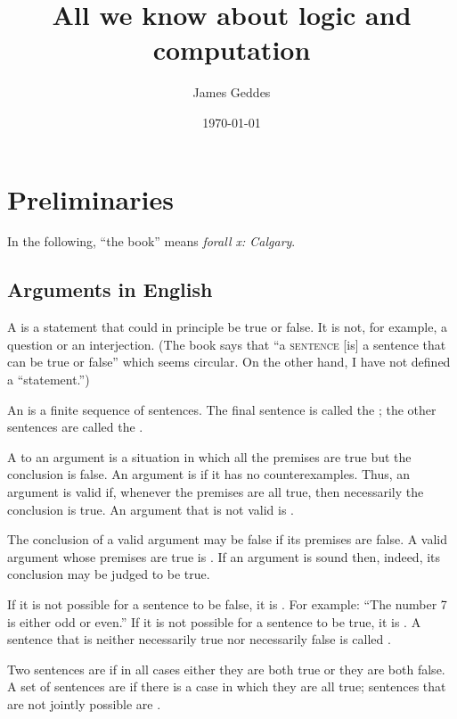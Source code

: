 \documentclass{article}
\title{All we know about logic and computation}
\author{James Geddes}
\date{\today}
\begin{document}
\maketitle
\section{Preliminaries}

In the following, ``the book'' means \emph{forall x: Calgary}.

\subsection{Arguments in English}
\label{sec:english}
A  is a statement that could in principle be true or
false.  It is not, for example, a question or an interjection.  (The
book says that ``a \textsc{sentence} [is] a sentence that can be true or
false'' which seems circular.  On the other hand, I have not defined a
``statement.'')

An  is a finite sequence of sentences.  The final sentence is called the ; the other sentences are called the . 

A  to an argument is a situation in which all the
premises are true but the conclusion is false.  An argument is
 if it has no counterexamples.  Thus, an
argument is valid if, whenever the premises are all true, then
necessarily the conclusion is true.  An argument that is not valid is
.

The conclusion of a valid argument may be false if its premises are false.  A valid argument whose premises are true is . If an argument is sound then, indeed, its conclusion may be judged to be true. 

If it is not possible for a sentence to be false, it is .  For example: ``The number 7 is
either odd or even.''  If it is not possible for a sentence to be true,
it is .  A sentence that is neither necessarily
true nor necessarily false is called .

Two sentences are  if in all cases either they
are both true or they are both false.  A set of sentences are
 if there is a
case in which they are all true; sentences that are not jointly possible
are .
\end{document}
